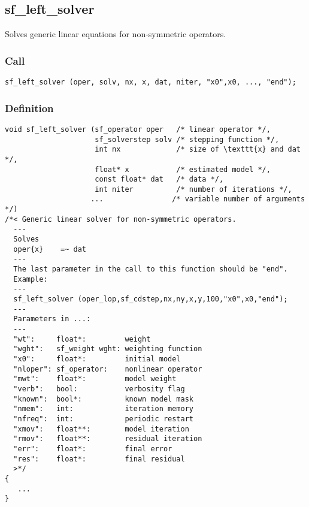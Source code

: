 \subsection{{sf\_left\_solver}}
Solves generic linear equations for non-symmetric operators.

\subsubsection*{Call}
\begin{verbatim}sf_left_solver (oper, solv, nx, x, dat, niter, "x0",x0, ..., "end");\end{verbatim}

\subsubsection*{Definition}
\begin{verbatim}
void sf_left_solver (sf_operator oper   /* linear operator */, 
                     sf_solverstep solv /* stepping function */, 
                     int nx             /* size of \texttt{x} and dat */, 
                     float* x           /* estimated model */, 
                     const float* dat   /* data */, 
                     int niter          /* number of iterations */, 
                    ...                /* variable number of arguments */)
/*< Generic linear solver for non-symmetric operators.
  ---
  Solves
  oper{x}    =~ dat
  ---
  The last parameter in the call to this function should be "end".
  Example: 
  ---
  sf_left_solver (oper_lop,sf_cdstep,nx,ny,x,y,100,"x0",x0,"end");
  ---
  Parameters in ...:
  ---
  "wt":     float*:         weight      
  "wght":   sf_weight wght: weighting function
  "x0":     float*:         initial model
  "nloper": sf_operator:    nonlinear operator
  "mwt":    float*:         model weight
  "verb":   bool:           verbosity flag
  "known":  bool*:          known model mask
  "nmem":   int:            iteration memory
  "nfreq":  int:            periodic restart
  "xmov":   float**:        model iteration
  "rmov":   float**:        residual iteration
  "err":    float*:         final error
  "res":    float*:         final residual
  >*/ 
{
   ...
}
\end{verbatim}

